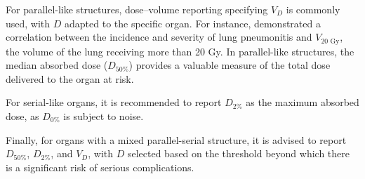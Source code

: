 For parallel-like structures, dose–volume reporting specifying $V_D$ is commonly used, with $D$ adapted to the specific organ.
For instance, \cite{Graham1995} demonstrated a correlation between the incidence and severity of lung pneumonitis and $V_{20 \text{ Gy}}$, the volume of the lung receiving more than 20 Gy.
In parallel-like structures, the median absorbed dose ($D_{50\%}$) provides a valuable measure of the total dose delivered to the organ at risk.

For serial-like organs, it is recommended to report $D_{2\%}$ as the maximum absorbed dose, as $D_{0\%}$ is subject to noise.

Finally, for organs with a mixed parallel-serial structure, it is advised to report $D_{50\%}$, $D_{2\%}$, and $V_D$, with $D$ selected based on the threshold beyond which there is a significant risk of serious complications.

